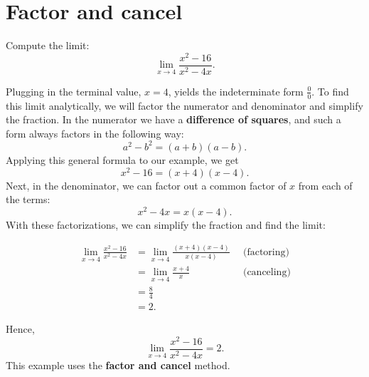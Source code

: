 \documentclass[handout]{ximera}
\begin{document}










\section{Factor and cancel}

\begin{example}[example 2]
Compute the limit: \[\lim_{x \to 4} \frac{x^2 - 16}{x^2 - 4x}.\]


Plugging in the terminal value, $x=4$, yields 
the indeterminate form $\frac00$.  To find this limit analytically, we will factor the numerator 
and denominator and simplify the fraction. In the numerator we have a \textbf{difference of squares}, and 
such a form always factors in the following way:
\[a^2 - b^2 = (a+b)(a-b).\]
Applying this general formula to our example, we get 
\[x^2 - 16 = (x+4)(x-4).\]  
Next, in the denominator, we can factor out a common factor
of $x$ from each of the terms:
\[x^2 - 4x = x(x-4).\]
With these factorizations, we can simplify the fraction and find the limit:

\begin{align*}
\lim_{x \to 4} \frac{x^2 - 16}{x^2 - 4x} &= \lim_{x \to 4} \frac{(x+4)(x-4)}{x(x-4)} \enspace & \text{(factoring)} \\[.4 em]
                                         &= \lim_{x \to 4} \frac{x+4}{x} & \text{(canceling)} \\[.4 em]
                                         &= \frac84  &  \\[.4 em]
																				 &= 2. &
\end{align*}																				
																				
Hence,
\[\lim_{x \to 4} \frac{x^2 - 16}{x^2 - 4x} = 2.\]
This example uses the \textbf{factor and cancel} method.
\end{example}
\end{document}
